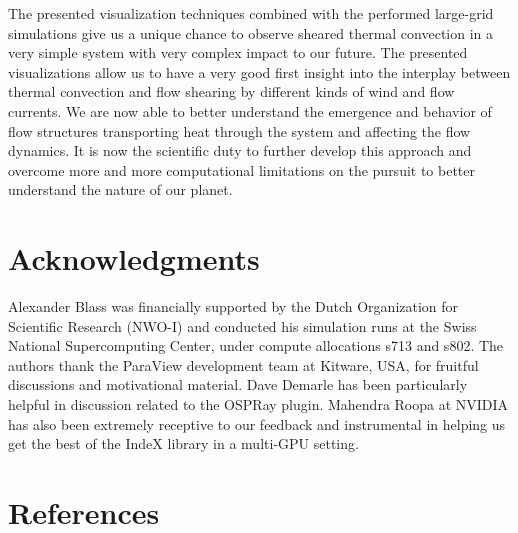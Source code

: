 \documentclass[final,5p,times,twocolumn]{elsarticle}
\begin{document}
The presented visualization techniques combined with the performed large-grid simulations give us a unique chance to observe sheared thermal convection in a very simple system with very complex impact to our future. The presented visualizations allow us to have a very good first insight into the interplay between thermal convection and flow shearing by different kinds of wind and flow currents. We are now able to better understand the emergence and behavior of flow structures transporting heat through the system and affecting the flow dynamics. It is now the scientific duty to further develop this approach and overcome more and more computational limitations on the pursuit to better understand the nature of our planet.  




\section*{Acknowledgments}

Alexander Blass was financially supported by the Dutch Organization for Scientific Research (NWO-I) and conducted his simulation runs at the Swiss National Supercomputing Center, under compute allocations s713 and s802. The authors thank the ParaView development team at Kitware, USA, for fruitful discussions and motivational material. Dave Demarle has been particularly helpful in discussion related to the OSPRay plugin. Mahendra Roopa ‎at NVIDIA has also been extremely receptive to our feedback and instrumental in helping us get the best of the IndeX library in a multi-GPU setting.

\section*{References}
 

\end{document}

